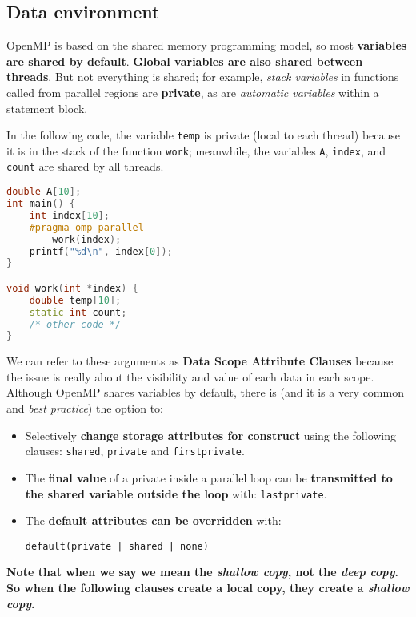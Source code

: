 \subsection{Data environment}

OpenMP is based on the shared memory programming model, so most \textbf{variables are shared by default}. \textbf{Global variables are also shared between threads}. But not everything is shared; for example, \emph{stack variables} in functions called from parallel regions are \textbf{private}, as are \emph{automatic variables} within a statement block.

\begin{examplebox}
    In the following code, the variable \texttt{temp} is private (local to each thread) because it is in the stack of the function \texttt{work}; meanwhile, the variables \texttt{A}, \texttt{index}, and \texttt{count} are shared by all threads.
    \begin{lstlisting}[language=C++]
double A[10];
int main() {
    int index[10];
    #pragma omp parallel
        work(index);
    printf("%d\n", index[0]);
}

void work(int *index) {
    double temp[10];
    static int count;
    /* other code */
}\end{lstlisting}
\end{examplebox}

\noindent
We can refer to these arguments as \textbf{Data Scope Attribute Clauses} because the issue is really about the visibility and value of each data in each scope. Although OpenMP shares variables by default, there is (and it is a very common and \emph{best practice}) the option to:
\begin{itemize}
    \item Selectively \textbf{change storage attributes for construct} using the following clauses: \texttt{shared}, \texttt{private} and \texttt{firstprivate}.
    \item The \textbf{final value} of a private inside a parallel loop can be \textbf{transmitted to the shared variable outside the loop} with: \texttt{lastprivate}.
    \item The \textbf{default attributes can be overridden} with:
    \vspace{-.8em}
    \begin{center}
        \texttt{default(private | shared | none)}
    \end{center}
    \vspace{-.8em}
\end{itemize}
\textcolor{Red2}{ \textbf{Note that when we say  we mean the \emph{shallow copy}, not the \emph{deep copy}. So when the following clauses create a local copy, they create a \emph{shallow copy}.}}

